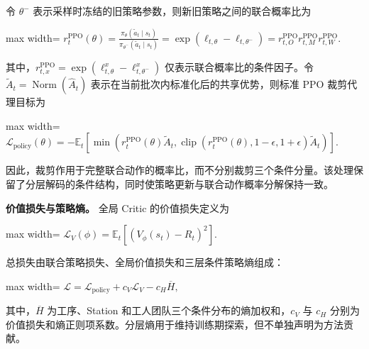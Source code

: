 \documentclass[journal,10pt]{IEEEtran}
\begin{document}
令 \(\theta^-\) 表示采样时冻结的旧策略参数，则新旧策略之间的联合概率比为

\begin{center}
\begin{adjustbox}{max width=\columnwidth}
$\displaystyle
r_t^{\mathrm{PPO}}(\theta)
=\frac{\pi_\theta(\widetilde a_t\mid s_t)}{\pi_{\theta^-}(\widetilde a_t\mid s_t)}
=\exp\!\left(\ell_{t,\theta}-\ell_{t,\theta^-}\right)
=r_{t,O}^{\mathrm{PPO}}r_{t,M}^{\mathrm{PPO}}r_{t,W}^{\mathrm{PPO}}.
$
\end{adjustbox}
\end{center}

其中，\(r_{t,x}^{\mathrm{PPO}}=\exp(\ell_{t,\theta}^x-\ell_{t,\theta^-}^x)\) 仅表示联合概率比的条件因子。令 \(\widetilde A_t=\operatorname{Norm}(\widehat A_t)\) 表示在当前批次内标准化后的共享优势，则标准 PPO 裁剪代理目标为

\begin{center}
\begin{adjustbox}{max width=\columnwidth}
$\displaystyle
\mathcal L_{\mathrm{policy}}(\theta)=
-\mathbb E_t\!\left[
\min\!\left(
r_t^{\mathrm{PPO}}(\theta)\widetilde A_t,
\operatorname{clip}\!\left(r_t^{\mathrm{PPO}}(\theta),1-\epsilon,1+\epsilon\right)\widetilde A_t
\right)
\right].
$
\end{adjustbox}
\end{center}

因此，裁剪作用于完整联合动作的概率比，而不分别裁剪三个条件分量。该处理保留了分层解码的条件结构，同时使策略更新与联合动作概率分解保持一致。

\textbf{价值损失与策略熵。} 全局 Critic 的价值损失定义为

\begin{center}
\begin{adjustbox}{max width=\columnwidth}
$\displaystyle
\mathcal L_V(\phi)=
\mathbb E_t\!\left[\left(V_\phi(s_t)-R_t\right)^2\right].
$
\end{adjustbox}
\end{center}

总损失由联合策略损失、全局价值损失和三层条件策略熵组成：

\begin{center}
\begin{adjustbox}{max width=\columnwidth}
$\displaystyle
\mathcal L=
\mathcal L_{\mathrm{policy}}
+c_V\mathcal L_V
-c_H\overline H,
$
\end{adjustbox}
\end{center}

其中，\(\overline H\) 为工序、Station 和工人团队三个条件分布的熵加权和，\(c_V\) 与 \(c_H\) 分别为价值损失和熵正则项系数。分层熵用于维持训练期探索，但不单独声明为方法贡献。
\end{document}
